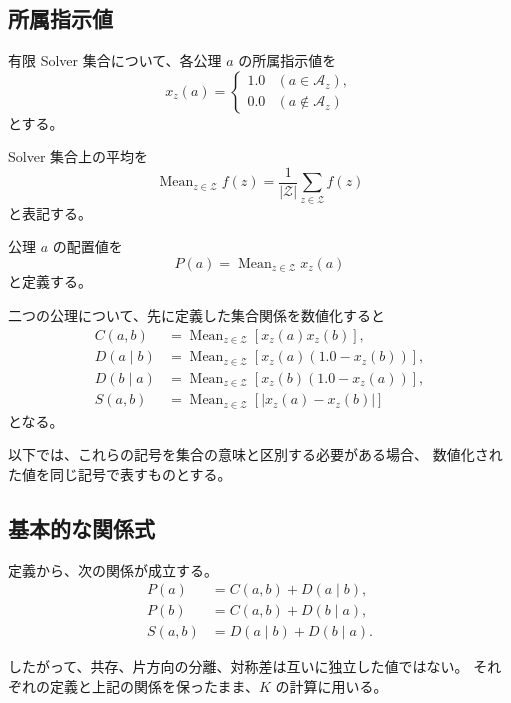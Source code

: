\documentclass[a4paper,11pt]{ltjsarticle}
\begin{document}
\subsection{所属指示値}

有限 Solver 集合について、各公理 $a$ の所属指示値を
\begin{equation}
  x_z(a)=
  \begin{cases}
    1.0 & (a\in\mathcal{A}_z),\\
    0.0 & (a\notin\mathcal{A}_z)
  \end{cases}
\end{equation}
とする。

Solver 集合上の平均を
\begin{equation}
  \operatorname{Mean}_{z\in\mathcal{Z}} f(z)
  =
  \frac{1}{|\mathcal{Z}|}
  \sum_{z\in\mathcal{Z}}f(z)
\end{equation}
と表記する。

公理 $a$ の配置値を
\begin{equation}
  P(a)
  =
  \operatorname{Mean}_{z\in\mathcal{Z}}x_z(a)
\end{equation}
と定義する。

二つの公理について、先に定義した集合関係を数値化すると
\begin{align}
  C(a,b)
  &=
  \operatorname{Mean}_{z\in\mathcal{Z}}
  [x_z(a)x_z(b)],\\
  D(a\mid b)
  &=
  \operatorname{Mean}_{z\in\mathcal{Z}}
  [x_z(a)(1.0-x_z(b))],\\
  D(b\mid a)
  &=
  \operatorname{Mean}_{z\in\mathcal{Z}}
  [x_z(b)(1.0-x_z(a))],\\
  S(a,b)
  &=
  \operatorname{Mean}_{z\in\mathcal{Z}}
  [|x_z(a)-x_z(b)|]
\end{align}
となる。

以下では、これらの記号を集合の意味と区別する必要がある場合、
数値化された値を同じ記号で表すものとする。

\subsection{基本的な関係式}

定義から、次の関係が成立する。
\begin{align}
  P(a)&=C(a,b)+D(a\mid b),\\
  P(b)&=C(a,b)+D(b\mid a),\\
  S(a,b)&=D(a\mid b)+D(b\mid a).
\end{align}

したがって、共存、片方向の分離、対称差は互いに独立した値ではない。
それぞれの定義と上記の関係を保ったまま、$K$ の計算に用いる。
\end{document}

